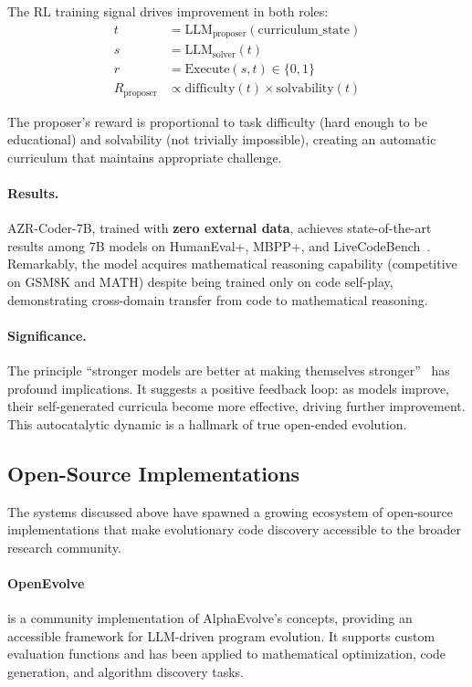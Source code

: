 The RL training signal drives improvement in both roles:
\begin{align}
    t &= \text{LLM}_{\text{proposer}}(\text{curriculum\_state}) \\
    s &= \text{LLM}_{\text{solver}}(t) \\
    r &= \text{Execute}(s, t) \in \{0, 1\} \\
    R_{\text{proposer}} &\propto \text{difficulty}(t) \times \text{solvability}(t)
\end{align}

The proposer's reward is proportional to task difficulty (hard enough to be educational) and solvability (not trivially impossible), creating an automatic curriculum that maintains appropriate challenge.

\paragraph{Results.}
AZR-Coder-7B, trained with \textbf{zero external data}, achieves state-of-the-art results among 7B models on HumanEval+, MBPP+, and LiveCodeBench~\citep{zhao2025absolutezero}. Remarkably, the model acquires mathematical reasoning capability (competitive on GSM8K and MATH) despite being trained only on code self-play, demonstrating cross-domain transfer from code to mathematical reasoning.

\paragraph{Significance.}
The principle ``stronger models are better at making themselves stronger''~\citep{zhao2025absolutezero} has profound implications. It suggests a positive feedback loop: as models improve, their self-generated curricula become more effective, driving further improvement. This autocatalytic dynamic is a hallmark of true open-ended evolution.

\subsection{Open-Source Implementations}
\label{sec:opensource-evo}

The systems discussed above have spawned a growing ecosystem of open-source implementations that make evolutionary code discovery accessible to the broader research community.

\paragraph{OpenEvolve} is a community implementation of AlphaEvolve's concepts, providing an accessible framework for LLM-driven program evolution. It supports custom evaluation functions and has been applied to mathematical optimization, code generation, and algorithm discovery tasks.

